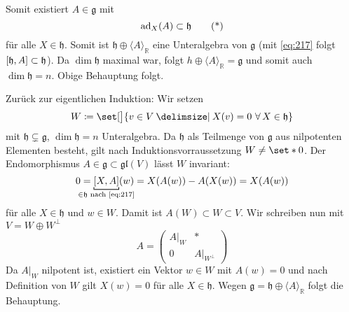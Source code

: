 \begin{beweis}
	Somit existiert $A \in \mathfrak{g}$ mit 
	\begin{equation}
		\ad_X(A) \subset \mathfrak{h} \label{eq:217} \tag{*}
	\end{equation}
	für alle $X \in \mathfrak{h}$.
	Somit ist $\mathfrak{h} \oplus \langle A \rangle_\mathbb{R}$ eine Unteralgebra von $\mathfrak{g}$ (mit \eqref{eq:217} folgt $\benbrace*{\mathfrak{h},A}\subset \mathfrak{h}$).
	Da $\dim \mathfrak{h}$ maximal war, folgt $h \oplus \langle A \rangle_\mathbb{R} = \mathfrak{g}$ und somit auch $\dim \mathfrak{h}=n$.
	Obige Behauptung folgt.
	
	Zurück zur eigentlichen Induktion:
	Wir setzen
	\[
		W \coloneqq \set[\big]{v \in V \given X(v)=0 \,\, \forall\, X \in \mathfrak{h}}
	\]
	mit $\mathfrak{h} \subsetneq \mathfrak{g}$, $\dim \mathfrak{h}=n$ Unteralgebra.
	Da $\mathfrak{h}$ als Teilmenge von $\mathfrak{g}$ aus nilpotenten Elementen besteht, gilt nach Induktionsvorraussetzung $W \neq \set*{0}$.
	Der Endomorphismus $A \in \mathfrak{g} \subset \mathfrak{gl}(V)$ lässt $W$ invariant:
	\[
		0 = \Underbracket{\benbrace*{X,A}}{\mathclap{\in \mathfrak{h} \text{ nach \eqref{eq:217}}} }(w) = X \enbrace*{A(w)} - A \enbrace*{X(w)} = X (A(w))
	\]
	für alle $X \in \mathfrak{h}$ und $w \in W$. Damit ist $A(W)\subset W \subset V$.
	Wir schreiben nun mit $V= W \oplus W^\bot$
	\[
		A = \begin{pmatrix}
			A|_W & * \\ 0 & A|_{W^\bot}
		\end{pmatrix}
	\]
	Da $A|_W$ nilpotent ist, existiert ein Vektor $w \in W$ mit $A(w)=0$ und nach Definition von $W$ gilt $X(w)=0$ für alle $X \in \mathfrak{h}$.
	Wegen $\mathfrak{g} = \mathfrak{h} \oplus \langle A \rangle_\mathbb{R}$ folgt die Behauptung.
\end{beweis}

